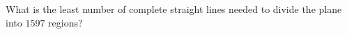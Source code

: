 What is the least number of complete straight lines needed to divide the plane into $1597$ regions?
